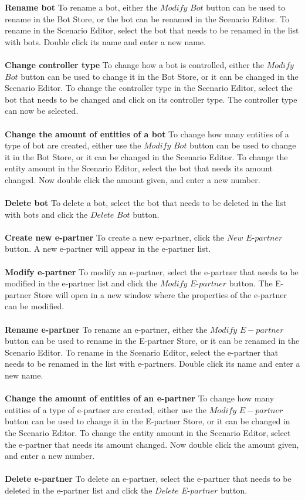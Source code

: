 \textbf{Rename bot}
To rename a bot, either the $Modify$ $Bot$ button can be used to rename in the Bot Store, or the bot can be renamed in the Scenario Editor. To rename in the Scenario Editor, select the bot that needs to be renamed in the list with bots. Double click its name and enter a new name.
\\\\
\textbf{Change controller type}
To change how a bot is controlled, either the $Modify$ $Bot$ button can be used to change it in the Bot Store, or it can be changed in the Scenario Editor. To change the controller type in the Scenario Editor, select the bot that needs to be changed and click on its controller type. The controller type can now be selected.
\\\\
\textbf{Change the amount of entities of a bot}
To change how many entities of a type of bot are created, either use the $Modify$ $Bot$ button can be used to change it in the Bot Store, or it can be changed in the Scenario Editor. To change the entity amount in the Scenario Editor, select the bot that needs its amount changed. Now double click the amount given, and enter a new number.
\\\\
\textbf{Delete bot}
To delete a bot, select the bot that needs to be deleted in the list with bots and click the $Delete$ $Bot$ button.
\\\\
\textbf{Create new e-partner}
To create a new e-partner, click the $New$ $E$-$partner$ button. A new e-partner will appear in the e-partner list.
\\\\
\textbf{Modify e-partner}
To modify an e-partner, select the e-partner that needs to be modified in the e-partner list and click the $Modify$ $E$-$partner$ button. The E-partner Store will open in a new window where the properties of the e-partner can be modified.
\\\\
\textbf{Rename e-partner}
To rename an e-partner, either the $Modify$ $E-partner$ button can be used to rename in the E-partner Store, or it can be renamed in the Scenario Editor. To rename in the Scenario Editor, select the e-partner that needs to be renamed in the list with e-partners. Double click its name and enter a new name.
\\\\
\textbf{Change the amount of entities of an e-partner}
To change how many entities of a type of e-partner are created, either use the $Modify$ $E-partner$ button can be used to change it in the E-partner Store, or it can be changed in the Scenario Editor. To change the entity amount in the Scenario Editor, select the e-partner that needs its amount changed. Now double click the amount given, and enter a new number.
\\\\
\textbf{Delete e-partner}
To delete an e-partner, select the e-partner that needs to be deleted in the e-partner list and click the $Delete$ $E$-$partner$ button.

